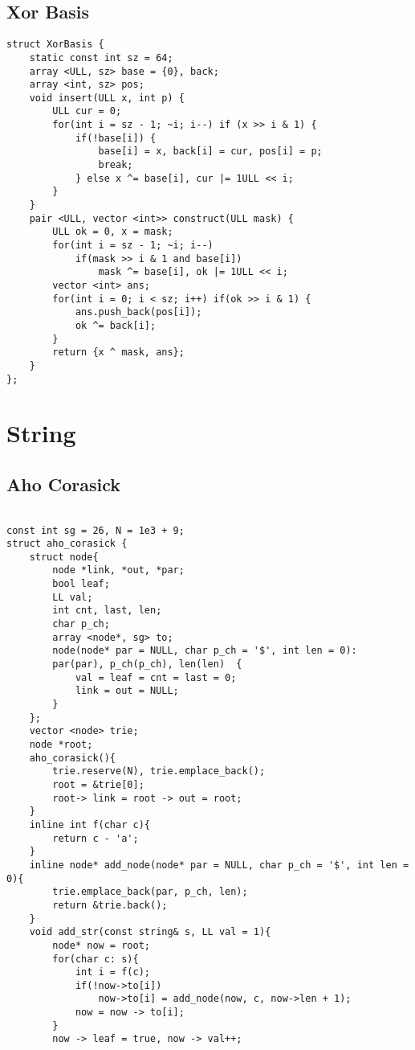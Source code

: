 \documentclass[FSZ,a4paper,onesided]{article}
\begin{document}
\begin{multicols*}{\COLS}
\subsection{Xor Basis}
\begin{lstlisting}
struct XorBasis {
    static const int sz = 64;
    array <ULL, sz> base = {0}, back;
    array <int, sz> pos;
    void insert(ULL x, int p) {
        ULL cur = 0;
        for(int i = sz - 1; ~i; i--) if (x >> i & 1) {
            if(!base[i]) {
                base[i] = x, back[i] = cur, pos[i] = p;
                break;
            } else x ^= base[i], cur |= 1ULL << i;
        }
    }
    pair <ULL, vector <int>> construct(ULL mask) {
        ULL ok = 0, x = mask;
        for(int i = sz - 1; ~i; i--)  
            if(mask >> i & 1 and base[i])
                mask ^= base[i], ok |= 1ULL << i;
        vector <int> ans;
        for(int i = 0; i < sz; i++) if(ok >> i & 1) {
            ans.push_back(pos[i]);
            ok ^= back[i];
        }
        return {x ^ mask, ans};
    } 
};\end{lstlisting}
\section{String}
\subsection{Aho Corasick}
\begin{lstlisting}

const int sg = 26, N = 1e3 + 9;
struct aho_corasick {
    struct node{
        node *link, *out, *par;
        bool leaf;
        LL val;
        int cnt, last, len;
        char p_ch;
        array <node*, sg> to;
        node(node* par = NULL, char p_ch = '$', int len = 0): 
        par(par), p_ch(p_ch), len(len)  {
            val = leaf = cnt = last = 0;
            link = out = NULL;
        }
    };
    vector <node> trie;
    node *root;
    aho_corasick(){
        trie.reserve(N), trie.emplace_back();
        root = &trie[0];
        root-> link = root -> out = root;
    }
    inline int f(char c){
        return c - 'a';
    }
    inline node* add_node(node* par = NULL, char p_ch = '$', int len = 0){
        trie.emplace_back(par, p_ch, len);
        return &trie.back();
    }
    void add_str(const string& s, LL val = 1){
        node* now = root;
        for(char c: s){
            int i = f(c);
            if(!now->to[i])
                now->to[i] = add_node(now, c, now->len + 1);
            now = now -> to[i];
        }
        now -> leaf = true, now -> val++;


\end{lstlisting}
\end{multicols*}
\end{document}
